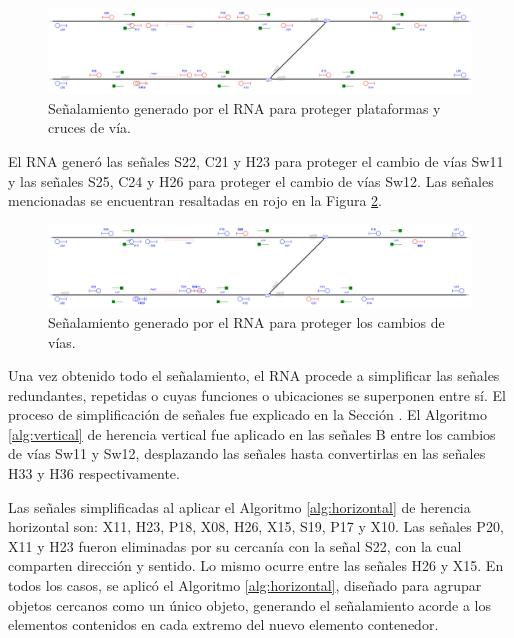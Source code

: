 	\begin{figure}[H]
		\centering
		\includegraphics[width=1\textwidth]{resultados-obtenidos/ejemplo8/images/8_step3.png}
		\centering\caption{Señalamiento generado por el RNA para proteger plataformas y cruces de vía.}
		\label{fig:EJ8_5}
	\end{figure}
	
	El RNA generó las señales S22, C21 y H23 para proteger el cambio de vías Sw11 y las señales S25, C24 y H26 para proteger el cambio de vías Sw12. Las señales mencionadas se encuentran resaltadas en rojo en la Figura \ref{fig:EJ8_6}.
	
	\begin{figure}[H]
		\centering
		\includegraphics[width=1\textwidth]{resultados-obtenidos/ejemplo8/images/8_step4.png}
		\centering\caption{Señalamiento generado por el RNA para proteger los cambios de vías.}
		\label{fig:EJ8_6}
	\end{figure}
	
	Una vez obtenido todo el señalamiento, el RNA procede a simplificar las señales redundantes, repetidas o cuyas funciones o ubicaciones se superponen entre sí. El proceso de simplificación de señales fue explicado en la Sección \label{sec:simplificacion}. El Algoritmo \ref{alg:vertical} de herencia vertical fue aplicado en las señales B entre los cambios de vías Sw11 y Sw12, desplazando las señales hasta convertirlas en las señales H33 y H36 respectivamente.
	
	Las señales simplificadas al aplicar el Algoritmo \ref{alg:horizontal} de herencia horizontal son: X11, H23, P18, X08, H26, X15, S19, P17 y X10. Las señales P20, X11 y H23 fueron eliminadas por su cercanía con la señal S22, con la cual comparten dirección y sentido. Lo mismo ocurre entre las señales H26 y X15. En todos los casos, se aplicó el Algoritmo \ref{alg:horizontal}, diseñado para agrupar objetos cercanos como un único objeto, generando el señalamiento acorde a los elementos contenidos en cada extremo del nuevo elemento contenedor.
	
